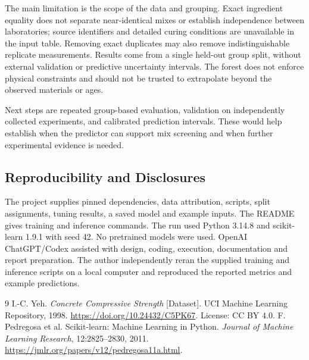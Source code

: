 \documentclass[10pt,a4paper]{article}
\begin{document}
The main limitation is the scope of the data and grouping. Exact ingredient
equality does not separate near-identical mixes or establish independence between
laboratories; source identifiers and detailed curing conditions are unavailable
in the input table. Removing exact duplicates may also remove indistinguishable
replicate measurements. Results come from a single held-out group split, without
external validation or predictive uncertainty intervals. The forest does not
enforce physical constraints and should not be trusted to extrapolate beyond
the observed materials or ages.

Next steps are repeated group-based evaluation, validation on independently
collected experiments, and calibrated prediction intervals. These would help
establish when the predictor can support mix screening and when further
experimental evidence is needed.

\subsection*{Reproducibility and Disclosures}
The project supplies pinned dependencies, data attribution, scripts, split
assignments, tuning results, a saved model and example inputs. The README gives
training and inference commands. The run used Python 3.14.8 and scikit-learn
1.9.1 with seed 42. No pretrained models were used. OpenAI ChatGPT/Codex assisted
with design, coding, execution, documentation and report preparation. The author
independently reran the supplied training and inference scripts on a local
computer and reproduced the reported metrics and example predictions.

\begin{thebibliography}{9}\small
{} I.-C. Yeh. \emph{Concrete Compressive Strength} [Dataset].
UCI Machine Learning Repository, 1998.
\url{https://doi.org/10.24432/C5PK67}. License: CC BY 4.0.
 F. Pedregosa et al. Scikit-learn: Machine Learning in Python.
\emph{Journal of Machine Learning Research}, 12:2825--2830, 2011.
\url{https://jmlr.org/papers/v12/pedregosa11a.html}.
\end{thebibliography}
\end{document}
